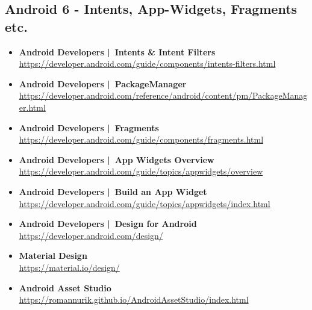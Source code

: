 \documentclass[a4paper]{article}
\begin{document}
	\subsection{Android 6 - Intents, App-Widgets, Fragments etc.}
	
	\begin{itemize}
		
		\item \textbf{Android Developers | Intents \& Intent Filters}\\
		\href{https://developer.android.com/guide/components/intents-filters.html}
		{https://developer.android.com/guide/components/intents-filters.html}
		
		\item \textbf{Android Developers | PackageManager}\\
		\href{https://developer.android.com/reference/android/content/pm/PackageManager.html}
		{https://developer.android.com/reference/android/content/pm/PackageManager.html}
		
		\item \textbf{Android Developers | Fragments}\\
		\href{https://developer.android.com/guide/components/fragments.html}
		{https://developer.android.com/guide/components/fragments.html}
		
		\item \textbf{Android Developers | App Widgets Overview}\\
		\href{https://developer.android.com/guide/topics/appwidgets/overview}
		{https://developer.android.com/guide/topics/appwidgets/overview}
		
		\item \textbf{Android Developers | Build an App Widget}\\
		\href{https://developer.android.com/guide/topics/appwidgets/index.html}
		{https://developer.android.com/guide/topics/appwidgets/index.html}
		
		\item \textbf{Android Developers | Design for Android}\\
		\href{https://developer.android.com/design/}
		{https://developer.android.com/design/}
		
		\item \textbf{Material Design}\\
		\href{https://material.io/design/}
		{https://material.io/design/}
		
		\item \textbf{Android Asset Studio}\\
		\href{https://romannurik.github.io/AndroidAssetStudio/index.html}
		{https://romannurik.github.io/AndroidAssetStudio/index.html}
		

\end{itemize}
\end{document}
